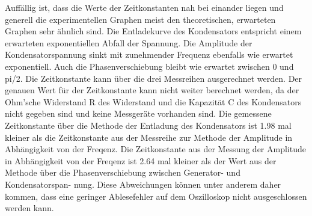 

    Auffällig ist, dass die Werte der Zeitkonstanten nah bei einander liegen und generell die experimentellen Graphen meist den theoretischen,
     erwarteten Graphen sehr ähnlich sind.
    Die Entladekurve des Kondensators entspricht einem erwarteten exponentiellen Abfall der Spannung.
    Die Amplitude der Kondensatorspannung sinkt mit zunehmender Frequenz ebenfalls wie erwartet exponentiell.
    Auch die Phasenverschiebung bleibt wie erwartet zwischen 0 und pi/2.
    Die Zeitkonstante kann über die drei Messreihen ausgerechnet werden.
    Der genauen Wert für der Zeitkonstante kann nicht weiter berechnet werden, da der Ohm’sche Widerstand R des Widerstand und die Kapazität C des Kondensators
     nicht gegeben sind und keine Messgeräte vorhanden sind.
    Die gemessene Zeitkonstante über die Methode der Entladung des Kondensators ist 1.98 mal kleiner als die Zeitkonstante
     aus der Messreihe zur Methode der Amplitude in Abhängigkeit von der Freqenz.
      Die Zeitkonstante aus der Messung der Amplitude in Abhängigkeit von der Freqenz ist 2.64 mal kleiner als der Wert aus der Methode über die
      Phasenverschiebung zwischen Generator- und Kondensatorspan- nung.
    Diese Abweichungen können unter anderem daher kommen, dass eine geringer Ablesefehler auf dem Oszilloskop  nicht ausgeschlossen werden kann.
